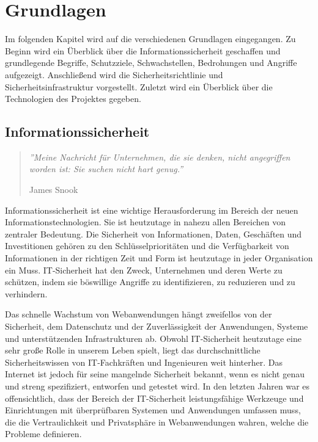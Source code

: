 \chapter{Grundlagen}
\label{chap:k2}

Im folgenden Kapitel wird auf die verschiedenen Grundlagen eingegangen. Zu Beginn wird ein Überblick über die Informationssicherheit geschaffen und grundlegende Begriffe, Schutzziele, Schwachstellen, Bedrohungen und Angriffe aufgezeigt. Anschließend wird die Sicherheitsrichtlinie und Sicherheitsinfrastruktur vorgestellt. Zuletzt wird ein Überblick über die Technologien des Projektes gegeben.

\section{Informationssicherheit}

\begin{quote}
	\emph{''Meine Nachricht für Unternehmen, die sie denken, nicht angegriffen worden ist: Sie suchen nicht hart genug.''}
	\begin{flushright}
		James Snook
	\end{flushright}
\end{quote}

Informationssicherheit ist eine wichtige Herausforderung im Bereich der neuen Informationstechnologien. Sie ist heutzutage in nahezu allen Bereichen von zentraler Bedeutung.  Die Sicherheit von Informationen, Daten, Geschäften und Investitionen gehören zu den Schlüsselprioritäten und die Verfügbarkeit von Informationen in der richtigen Zeit und Form ist heutzutage in jeder Organisation ein Muss. IT-Sicherheit hat den Zweck, Unternehmen und deren Werte zu schützen, indem sie böswillige Angriffe zu identifizieren, zu reduzieren und zu verhindern.

Das schnelle Wachstum von Webanwendungen hängt zweifellos von der Sicherheit, dem Datenschutz und der Zuverlässigkeit der Anwendungen, Systeme und unterstützenden Infrastrukturen ab. Obwohl IT-Sicherheit heutzutage eine sehr große Rolle in unserem Leben spielt, liegt das durchschnittliche Sicherheitswissen von IT-Fachkräften und Ingenieuren weit hinterher. Das Internet ist jedoch für seine mangelnde Sicherheit bekannt, wenn es nicht genau und streng spezifiziert, entworfen und getestet wird. In den letzten Jahren war es offensichtlich, dass der Bereich der IT-Sicherheit leistungsfähige Werkzeuge und Einrichtungen mit überprüfbaren Systemen und Anwendungen umfassen muss, die die Vertraulichkeit und Privatsphäre in Webanwendungen wahren, welche die Probleme definieren\cite[1]{furnell2008securing}.

